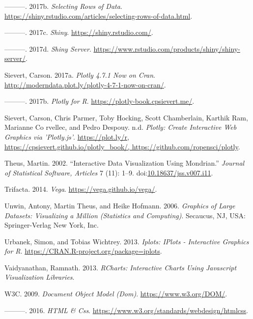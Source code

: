 \documentclass[11pt,]{report}
\begin{document}
\hypertarget{ref-shiny05}{}
---------. 2017b. \emph{Selecting Rows of Data}.
\url{https://shiny.rstudio.com/articles/selecting-rows-of-data.html}.

\hypertarget{ref-shiny02}{}
---------. 2017c. \emph{Shiny}. \url{https://shiny.rstudio.com/}.

\hypertarget{ref-shiny04}{}
---------. 2017d. \emph{Shiny Server}.
\url{https://www.rstudio.com/products/shiny/shiny-server/}.

\hypertarget{ref-sievert03}{}
Sievert, Carson. 2017a. \emph{Plotly 4.7.1 Now on Cran}.
\url{http://moderndata.plot.ly/plotly-4-7-1-now-on-cran/}.

\hypertarget{ref-sievert01}{}
---------. 2017b. \emph{Plotly for R}.
\url{https://plotly-book.cpsievert.me/}.

\hypertarget{ref-plotly01}{}
Sievert, Carson, Chris Parmer, Toby Hocking, Scott Chamberlain, Karthik
Ram, Marianne Co rvellec, and Pedro Despouy. n.d. \emph{Plotly: Create
Interactive Web Graphics via 'Plotly.js'}.
\href{https://plot.ly/r,\%20https://cpsievert.github.io/plotly_book/,\%20https://github.com/ropensci/plotly}{https://plot.ly/r, https://cpsievert.github.io/plotly\_book/, https://github.com/ropensci/plotly}.

\hypertarget{ref-theus02}{}
Theus, Martin. 2002. ``Interactive Data Visualization Using Mondrian.''
\emph{Journal of Statistical Software, Articles} 7 (11): 1--9.
doi:\href{https://doi.org/10.18637/jss.v007.i11}{10.18637/jss.v007.i11}.

\hypertarget{ref-vega01}{}
Trifacta. 2014. \emph{Vega}. \url{https://vega.github.io/vega/}.

\hypertarget{ref-unwin01}{}
Unwin, Antony, Martin Theus, and Heike Hofmann. 2006. \emph{Graphics of
Large Datasets: Visualizing a Million (Statistics and Computing)}.
Secaucus, NJ, USA: Springer-Verlag New York, Inc.

\hypertarget{ref-iplot01}{}
Urbanek, Simon, and Tobias Wichtrey. 2013. \emph{Iplots: IPlots -
Interactive Graphics for R}.
\url{https://CRAN.R-project.org/package=iplots}.

\hypertarget{ref-vaidyan13}{}
Vaidyanathan, Ramnath. 2013. \emph{RCharts: Interactive Charts Using
Javascript Visualization Libraries}.

\hypertarget{ref-w3c}{}
W3C. 2009. \emph{Document Object Model (Dom)}.
\url{https://www.w3.org/DOM/}.

\hypertarget{ref-w3c02}{}
---------. 2016. \emph{HTML \& Css}.
\url{https://www.w3.org/standards/webdesign/htmlcss}.
\end{document}
